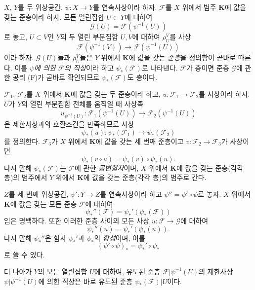 \begin{env}[3.4.1]
\label{0.3.4.1-ko}
$X$, $Y$를 두 위상공간, $\psi:X\to Y$를 연속사상이라 하자. $\mathcal F$를 $X$ 위에서 범주 $\mathbf K$에 값을 갖는 준층이라 하자. 모든 열린집합 $U\subset Y$에 대하여
\[
  \mathcal G(U)=\mathcal F(\psi^{-1}(U))
\]
로 놓고, $U\subset V$인 $Y$의 두 열린 부분집합 $U,V$에 대하여 $\rho_U^V$를 사상
\[
  \mathcal F(\psi^{-1}(V))
  \longrightarrow\mathcal F(\psi^{-1}(U))
\]
이라 하자. $\mathcal G(U)$들과 $\rho_U^V$들은 $Y$ 위에서 $\mathbf K$에 값을 갖는 \emph{준층}을 정의함이 곧바로 따른다. 이를 \emph{$\psi$에 의한 $\mathcal F$의 직상}이라 하고 $\psi_*(\mathcal F)$로 나타낸다. $\mathcal F$가 층이면 준층 $\mathcal G$에 관한 공리 (F)가 곧바로 확인되므로 $\psi_*(\mathcal F)$도 층이다.
\end{env}

\begin{env}[3.4.2]
\label{0.3.4.2-ko}
$\mathcal F_1$, $\mathcal F_2$를 $X$ 위에서 $\mathbf K$에 값을 갖는 두 준층이라 하고, $u:\mathcal F_1\to\mathcal F_2$를 사상이라 하자. $U$가 $Y$의 열린 부분집합 전체를 움직일 때 사상족
\[
  u_{\psi^{-1}(U)}:
  \mathcal F_1(\psi^{-1}(U))
  \longrightarrow\mathcal F_2(\psi^{-1}(U))
\]
은 제한사상과의 호환조건을 만족하므로 사상
\[
  \psi_*(u):\psi_*(\mathcal F_1)
  \longrightarrow\psi_*(\mathcal F_2)
\]
를 정의한다. $\mathcal F_3$가 $X$ 위에서 $\mathbf K$에 값을 갖는 세 번째 준층이고 $v:\mathcal F_2\to\mathcal F_3$가 사상이면
\[
  \psi_*(v\circ u)=\psi_*(v)\circ\psi_*(u).
\]
다시 말해 $\psi_*(\mathcal F)$는 $\mathcal F$에 관한 \emph{공변함자}이며, $X$ 위에서 $\mathbf K$에 값을 갖는 준층(각각 층)의 범주에서 $Y$ 위에서 $\mathbf K$에 값을 갖는 준층(각각 층)의 범주로 간다.
\end{env}

\begin{env}[3.4.3]
\label{0.3.4.3-ko}
$Z$를 세 번째 위상공간, $\psi':Y\to Z$를 연속사상이라 하고 $\psi''=\psi'\circ\psi$로 놓자. $X$ 위에서 $\mathbf K$에 값을 갖는 모든 준층 $\mathcal F$에 대하여
\[
  \psi_*''(\mathcal F)
  =\psi_*'(\psi_*(\mathcal F))
\]
임은 명백하다. 또한 이러한 준층 사이의 모든 사상 $u:\mathcal F\to\mathcal G$에 대하여
\[
  \psi_*''(u)=\psi_*'(\psi_*(u)).
\]
다시 말해 $\psi_*''$은 함자 $\psi_*'$과 $\psi_*$의 \emph{합성}이며, 이를
\[
  (\psi'\circ\psi)_*=\psi_*'\circ\psi_*
\]
로 쓸 수 있다.

더 나아가 $Y$의 모든 열린집합 $U$에 대하여, 유도된 준층 $\mathcal F|\psi^{-1}(U)$의 제한사상 $\psi|\psi^{-1}(U)$에 의한 직상은 바로 유도된 준층 $\psi_*(\mathcal F)|U$이다.
\end{env}

